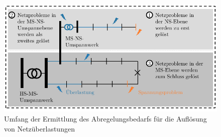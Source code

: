 \begin{figure}[H]
    \centering
    \includegraphics[width=\textwidth]{Bilder/grid_issues_scope_cropped}
    \caption[Umfang der Ermittlung des Abregelungsbedarfs für die Auflösung von Spannungsbandverletzungen und Betriebsmittelüberbelastungen]{Umfang der Ermittlung des Abregelungsbedarfs für die Auflösung von Netzüberlastungen \cite{Schachler}}\label{fig:scope_curtailment}
\end{figure}